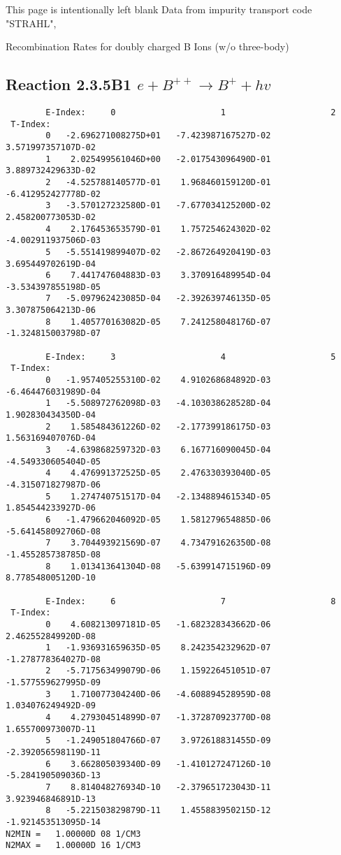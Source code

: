 \documentclass[12pt,dvipdfmx]{article}
\begin{document}
{\begin{small}
\begin{verbatim}
\end{verbatim}\end{small}
\newpage
This page is intentionally left blank
\newpage
Data from impurity transport code "STRAHL", \cite{kn:Behringer}

  Recombination Rates for doubly charged B Ions (w/o three-body)
\subsection{
Reaction 2.3.5B1  $e + B^{++} \rightarrow B^+ + hv$
}

\begin{small}\begin{verbatim}
        E-Index:     0                     1                     2
 T-Index:
        0   -2.696271008275D+01   -7.423987167527D-02    3.571997357107D-02
        1    2.025499561046D+00   -2.017543096490D-01    3.889732429633D-02
        2   -4.525788140577D-01    1.968460159120D-01   -6.412952427778D-02
        3   -3.570127232580D-01   -7.677034125200D-02    2.458200773053D-02
        4    2.176453653579D-01    1.757254624302D-02   -4.002911937506D-03
        5   -5.551419899407D-02   -2.867264920419D-03    3.695449702619D-04
        6    7.441747604883D-03    3.370916489954D-04   -3.534397855198D-05
        7   -5.097962423085D-04   -2.392639746135D-05    3.307875064213D-06
        8    1.405770163082D-05    7.241258048176D-07   -1.324815003798D-07

        E-Index:     3                     4                     5
 T-Index:
        0   -1.957405255310D-02    4.910268684892D-03   -6.464476031989D-04
        1   -5.508972762098D-03   -4.103038628528D-04    1.902830434350D-04
        2    1.585484361226D-02   -2.177399186175D-03    1.563169407076D-04
        3   -4.639868259732D-03    6.167716090045D-04   -4.549330605404D-05
        4    4.476991372525D-05    2.476330393040D-05   -4.315071827987D-06
        5    1.274740751517D-04   -2.134889461534D-05    1.854544233927D-06
        6   -1.479662046092D-05    1.581279654885D-06   -5.641458092706D-08
        7    3.704493921569D-07    4.734791626350D-08   -1.455285738785D-08
        8    1.013413641304D-08   -5.639914715196D-09    8.778548005120D-10

        E-Index:     6                     7                     8
 T-Index:
        0    4.608213097181D-05   -1.682328343662D-06    2.462552849920D-08
        1   -1.936931659635D-05    8.242354232962D-07   -1.278778364027D-08
        2   -5.717563499079D-06    1.159226451051D-07   -1.577559627995D-09
        3    1.710077304240D-06   -4.608894528959D-08    1.034076249492D-09
        4    4.279304514899D-07   -1.372870923770D-08    1.655700973007D-11
        5   -1.249051804766D-07    3.972618831455D-09   -2.392056598119D-11
        6    3.662805039340D-09   -1.410127247126D-10   -5.284190509036D-13
        7    8.814048276934D-10   -2.379651723043D-11    3.923946846891D-13
        8   -5.221503829879D-11    1.455883950215D-12   -1.921453513095D-14
N2MIN =   1.00000D 08 1/CM3
N2MAX =   1.00000D 16 1/CM3


\end{verbatim}
\end{small}}
\end{document}
